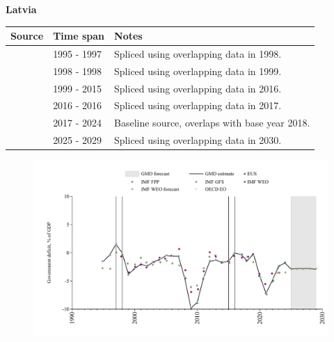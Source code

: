 \documentclass[12pt,a4paper,landscape]{article}
\begin{document}
\begin{adjustbox}{max totalsize={\paperwidth}{\paperheight},center}
\begin{minipage}[t][\textheight][t]{\textwidth}
\vspace*{0.5cm}
{}
\begin{center}
{\Large\bfseries Latvia}
\end{center}
\vspace{0.5cm}
\begin{table}[H]
\centering
\small
\begin{tabular}{|l|l|l|}
\hline
\textbf{Source} & \textbf{Time span} & \textbf{Notes} \\
\hline
\rowcolor{white}\cite{EUS}& 1995 - 1997 &Spliced using overlapping data in 1998.\\
\rowcolor{lightgray}\cite{OECD_EO}& 1998 - 1998 &Spliced using overlapping data in 1999.\\
\rowcolor{white}\cite{EUS}& 1999 - 2015 &Spliced using overlapping data in 2016.\\
\rowcolor{lightgray}\cite{OECD_EO}& 2016 - 2016 &Spliced using overlapping data in 2017.\\
\rowcolor{white}\cite{EUS}& 2017 - 2024 &Baseline source, overlaps with base year 2018.\\
\rowcolor{lightgray}\cite{IMF_WEO_forecast}& 2025 - 2029 &Spliced using overlapping data in 2030.\\
\hline
\end{tabular}
\end{table}
\begin{figure}[H]
\centering
\includegraphics[width=\textwidth,height=0.6\textheight,keepaspectratio]{graphs/LVA_govdef_GDP.pdf}
\end{figure}
\end{minipage}
\end{adjustbox}
\end{document}
